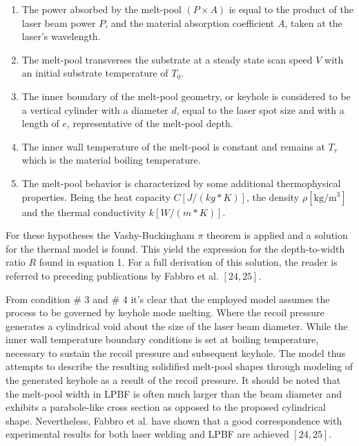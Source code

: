 \documentclass[10pt]{article}
\begin{document}
\begin{enumerate}
  \item The power absorbed by the melt-pool $(P \times A)$ is equal to the product of the laser beam power $P$, and the material absorption coefficient $A$, taken at the laser's wavelength.

  \item The melt-pool transverses the substrate at a steady state scan speed $V$ with an initial substrate temperature of $T_{0}$.

  \item The inner boundary of the melt-pool geometry, or keyhole is considered to be a vertical cylinder with a diameter $d$, equal to the laser spot size and with a length of $e$, representative of the melt-pool depth.

  \item The inner wall temperature of the melt-pool is constant and remains at $T_{v}$ which is the material boiling temperature.

  \item The melt-pool behavior is characterized by some additional thermophysical properties. Being the heat capacity $C[J /(k g * K)]$, the density $\rho\left[\mathrm{kg} / \mathrm{m}^{3}\right]$ and the thermal conductivity $k[W /(m * K)]$.

\end{enumerate}

For these hypotheses the Vashy-Buckingham $\pi$ theorem is applied and a solution for the thermal model is found. This yield the expression for the depth-to-width ratio $R$ found in equation 1. For a full derivation of this solution, the reader is referred to preceding publications by Fabbro et al. $[24,25]$.

From condition \# 3 and \# 4 it's clear that the employed model assumes the process to be governed by keyhole mode melting. Where the recoil pressure generates a cylindrical void about the size of the laser beam diameter. While the inner wall temperature boundary conditions is set at boiling temperature, necessary to sustain the recoil pressure and subsequent keyhole. The model thus attempts to describe the resulting solidified melt-pool shapes through modeling of the generated keyhole as a result of the recoil pressure. It should be noted that the melt-pool width in LPBF is often much larger than the beam diameter and exhibits a parabole-like cross section as opposed to the proposed cylindrical shape. Nevertheless, Fabbro et al. have shown that a good correspondence with experimental results for both laser welding and LPBF are achieved $[24,25]$.
\end{document}
